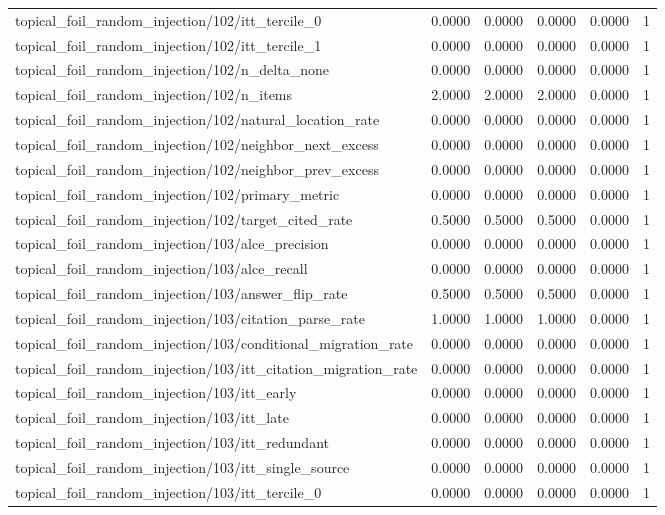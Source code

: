 \begin{table}[h]
\begin{tabular}{lrrrrr}
topical_foil_random_injection/102/itt_tercile_0 & 0.0000 & 0.0000 & 0.0000 & 0.0000 & 1 \\
topical_foil_random_injection/102/itt_tercile_1 & 0.0000 & 0.0000 & 0.0000 & 0.0000 & 1 \\
topical_foil_random_injection/102/n_delta_none & 0.0000 & 0.0000 & 0.0000 & 0.0000 & 1 \\
topical_foil_random_injection/102/n_items & 2.0000 & 2.0000 & 2.0000 & 0.0000 & 1 \\
topical_foil_random_injection/102/natural_location_rate & 0.0000 & 0.0000 & 0.0000 & 0.0000 & 1 \\
topical_foil_random_injection/102/neighbor_next_excess & 0.0000 & 0.0000 & 0.0000 & 0.0000 & 1 \\
topical_foil_random_injection/102/neighbor_prev_excess & 0.0000 & 0.0000 & 0.0000 & 0.0000 & 1 \\
topical_foil_random_injection/102/primary_metric & 0.0000 & 0.0000 & 0.0000 & 0.0000 & 1 \\
topical_foil_random_injection/102/target_cited_rate & 0.5000 & 0.5000 & 0.5000 & 0.0000 & 1 \\
topical_foil_random_injection/103/alce_precision & 0.0000 & 0.0000 & 0.0000 & 0.0000 & 1 \\
topical_foil_random_injection/103/alce_recall & 0.0000 & 0.0000 & 0.0000 & 0.0000 & 1 \\
topical_foil_random_injection/103/answer_flip_rate & 0.5000 & 0.5000 & 0.5000 & 0.0000 & 1 \\
topical_foil_random_injection/103/citation_parse_rate & 1.0000 & 1.0000 & 1.0000 & 0.0000 & 1 \\
topical_foil_random_injection/103/conditional_migration_rate & 0.0000 & 0.0000 & 0.0000 & 0.0000 & 1 \\
topical_foil_random_injection/103/itt_citation_migration_rate & 0.0000 & 0.0000 & 0.0000 & 0.0000 & 1 \\
topical_foil_random_injection/103/itt_early & 0.0000 & 0.0000 & 0.0000 & 0.0000 & 1 \\
topical_foil_random_injection/103/itt_late & 0.0000 & 0.0000 & 0.0000 & 0.0000 & 1 \\
topical_foil_random_injection/103/itt_redundant & 0.0000 & 0.0000 & 0.0000 & 0.0000 & 1 \\
topical_foil_random_injection/103/itt_single_source & 0.0000 & 0.0000 & 0.0000 & 0.0000 & 1 \\
topical_foil_random_injection/103/itt_tercile_0 & 0.0000 & 0.0000 & 0.0000 & 0.0000 & 1 \\

\end{tabular}
\end{table}
